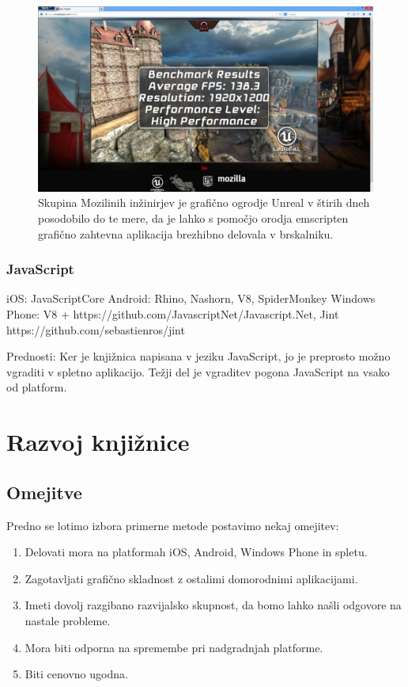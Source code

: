 \begin{figure}
 \includegraphics[width=\linewidth]{emscripten-epic-citadel}
 \caption{Skupina Mozilinih inžinirjev je grafično ogrodje Unreal v štirih dneh posodobilo do te mere, da je lahko s pomočjo orodja emscripten grafično zahtevna aplikacija brezhibno delovala v brskalniku.}
 \label{fig:epic-citadel}
\end{figure}

\subsection{JavaScript}

iOS: JavaScriptCore
Android: Rhino, Nashorn, V8, SpiderMonkey
Windows Phone: V8 + https://github.com/JavascriptNet/Javascript.Net, Jint https://github.com/sebastienros/jint

Prednosti: Ker je knjižnica napisana v jeziku JavaScript, jo je preprosto možno vgraditi v spletno aplikacijo. Težji del je vgraditev pogona JavaScript na vsako od platform.

\chapter{Razvoj knjižnice}
\label{chap:development}

\section{Omejitve}

Predno se lotimo izbora primerne metode postavimo nekaj omejitev:

\begin{enumerate}
  \item Delovati mora na platformah iOS, Android, Windows Phone in spletu.
  \item Zagotavljati grafično skladnost z ostalimi domorodnimi aplikacijami.
  \item Imeti dovolj razgibano razvijalsko skupnost, da bomo lahko našli odgovore na nastale probleme.
  \item Mora biti odporna na spremembe pri nadgradnjah platforme.
  \item Biti cenovno ugodna.
\end{enumerate}

